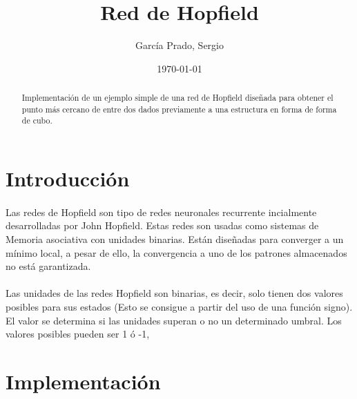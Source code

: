 \documentclass[10pt, a4paper,spanish]{article}
\title{\vspace{-15mm}\fontsize{24pt}{10pt}\selectfont\textbf{Red de Hopfield}}
\author{García Prado, Sergio}
\date{\today}
\begin{document}
	\maketitle

	\thispagestyle{fancy}



	\begin{abstract}
		\noindent Implementación de un ejemplo simple de una red de Hopfield diseñada para obtener el punto más cercano de entre dos dados previamente a una estructura en forma de forma de cubo.
	\end{abstract}



  \section{Introducción}

    \paragraph{}
		Las redes de Hopfield son tipo de redes neuronales recurrente incialmente desarrolladas por John Hopfield. Estas redes son usadas como sistemas de Memoria asociativa con unidades binarias. Están diseñadas para converger a un mínimo local, a pesar de ello, la convergencia a uno de los patrones almacenados no está garantizada.

		\paragraph{}
		Las unidades de las redes Hopfield son binarias, es decir, solo tienen dos valores posibles para sus estados (Esto se consigue a partir del uso de una función signo). El valor se determina si las unidades superan o no un determinado umbral. Los valores posibles pueden ser 1 ó -1,


	\section{Implementación}

		\paragraph{}
\end{document}

